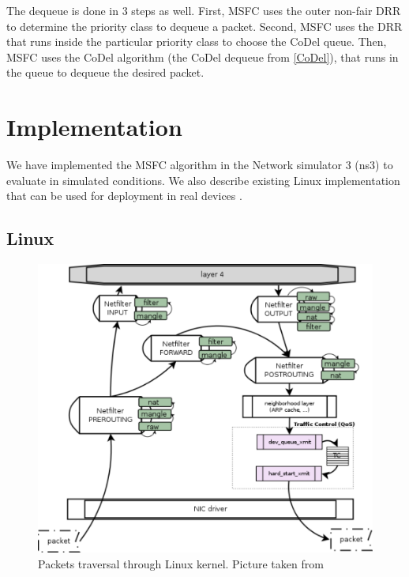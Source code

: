 The dequeue is done in 3 steps as well. First, MSFC uses the outer non-fair DRR to determine the priority class to dequeue a packet. Second, MSFC uses the DRR that runs inside the particular priority class to choose the CoDel queue. Then, MSFC uses the CoDel algorithm (the CoDel dequeue from \autoref{CoDel}), that runs in the queue to dequeue the desired packet.


\section {Implementation}

We have implemented the MSFC algorithm in the Network simulator 3 (ns3) to evaluate  in simulated conditions. We also describe existing Linux implementation that can be used for  deployment in real devices .

\subsection {Linux}
\begin{figure}
	\centering
	\includegraphics[width=137mm]{drawings/network_stack}
	\caption{Packets traversal through Linux kernel. Picture taken from \cite{linuxCore}}
	\label{fig12:linux}
\end{figure}

